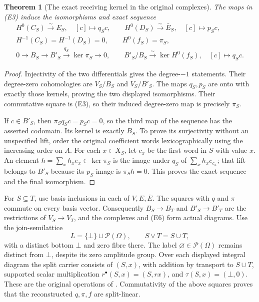 \documentclass[11pt]{article}
\newtheorem{theorem}{Theorem}
\begin{document}
\begin{theorem}[The exact receiving kernel in the original complexes]
The maps in (E3) induce the isomorphisms and exact sequence
\[
 \begin{gathered}
 H^0(C_S)\overset{\sim}{\longrightarrow}E_S,\quad[c]\longmapsto q_Sc,
 \qquad
 H^0(D_S)\overset{\sim}{\longrightarrow}\bar E_S,\quad[c]\longmapsto p_Sc,\\
 H^{-1}(C_S)=H^{-1}(D_S)=0,\qquad H^0(f_S)=\pi_S,\\
 0\longrightarrow B_S\longrightarrow B'_S
       \overset{q_S}{\longrightarrow}\ker\pi_S\longrightarrow0,\qquad
 B'_S/B_S\overset{\sim}{\longrightarrow}\ker H^0(f_S),
       \quad[c]\longmapsto q_Sc .
 \end{gathered}
 \tag{E6}
\]
\end{theorem}
\begin{proof}
Injectivity of the two differentials gives the degree-\(-1\) statements.
Their degree-zero cohomologies are \(V_S/B_S\) and \(V_S/B'_S\).
The maps \(q_S,p_S\) are onto with exactly those kernels, proving the two
displayed isomorphisms.  Their commutative square is (E3), so their induced
degree-zero map is precisely \(\pi_S\).

If \(c\in B'_S\), then \(\pi_Sq_Sc=p_Sc=0\), so the third map of the
sequence has the asserted codomain.  Its kernel is exactly \(B_S\).
To prove its surjectivity without an unspecified lift, order the original
coefficient words lexicographically using the increasing order on \(A\).
For each \(x\in X_S\), let \(c_x\) be the first word in \(S\) with value
\(x\).  An element \(h=\sum_xh_xe_x\in\ker\pi_S\) is the image under
\(q_S\) of \(\sum_xh_xe_{c_x}\); that lift belongs to \(B'_S\) because
its \(p_S\)-image is \(\pi_Sh=0\).  This proves the exact sequence and
the final isomorphism.
\end{proof}

For \(S\subseteq T\), use basis inclusions in each of \(V,E,\bar E\).
The squares with \(q\) and \(\pi\) commute on every basis vector.
Consequently \(B_S\to B_T\) and \(B'_S\to B'_T\) are the restrictions
of \(V_S\to V_T\), and the complexes and (E6) form actual diagrams.
Use the join-semilattice
\[
 L=\{\bot\}\sqcup\mathcal P(\Omega),\qquad S\vee T=S\cup T,
 \tag{E7}
\]
with a distinct bottom \(\bot\) and zero fibre there.  The label
\(\varnothing\in\mathcal P(\Omega)\) remains distinct from \(\bot\),
despite its zero amplitude group.  Over each displayed integral diagram
the split carrier consists of \((S,x)\), with addition by transport to
\(S\cup T\), supported scalar multiplication \(r^\bullet(S,x)=(S,rx)\),
and \(\tau(S,x)=(\bot,0)\).  These are the original operations
of \cite[(D2)]{support}.  Commutativity of the above squares proves
that the reconstructed \(q,\pi,f\) are split-linear.
\end{document}
